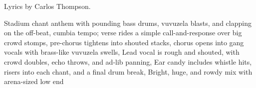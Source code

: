 
\begin{notes}
Lyrics by Carlos Thompson.
\end{notes}
\begin{style}
Stadium chant anthem with pounding bass drums, vuvuzela blasts, and clapping on the off-beat, cumbia tempo; verse rides a simple call-and-response over big crowd stomps, pre-chorus tightens into shouted stacks, chorus opens into gang vocals with brass-like vuvuzela swells, Lead vocal is rough and shouted, with crowd doubles, echo throws, and ad-lib panning, Ear candy includes whistle hits, risers into each chant, and a final drum break, Bright, huge, and rowdy mix with arena-sized low end
\end{style}
